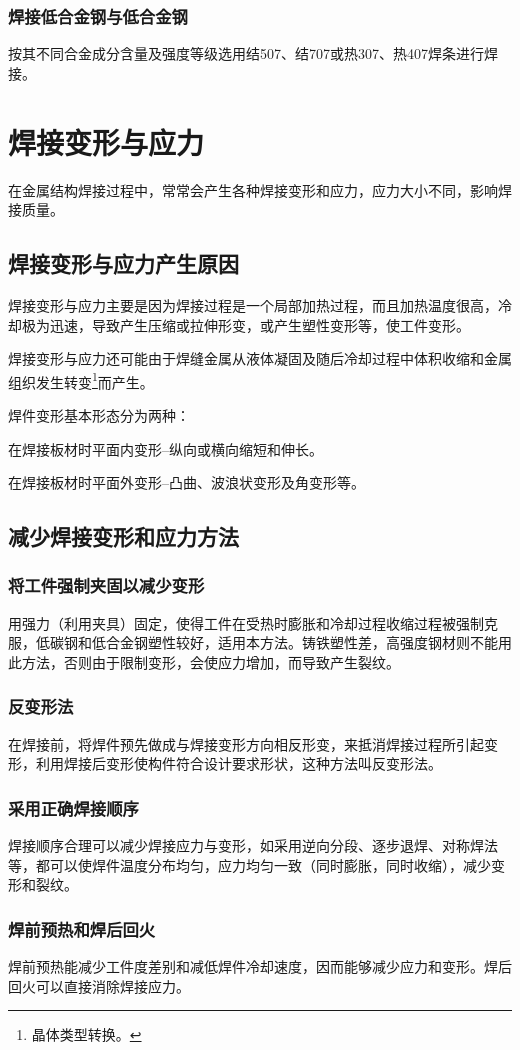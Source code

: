 \documentclass{ctexbook}
\begin{document}
\subsubsection{焊接低合金钢与低合金钢}
按其不同合金成分含量及强度等级选用结507、结707或热307、热407焊条进行焊接。
\section{焊接变形与应力}
在金属结构焊接过程中，常常会产生各种焊接变形和应力，应力大小不同，影响焊接质量。
\subsection{焊接变形与应力产生原因}
焊接变形与应力主要是因为焊接过程是一个局部加热过程，而且加热温度很高，冷却极为迅速，导致产生压缩或拉伸形变，或产生塑性变形等，使工件变形。

焊接变形与应力还可能由于焊缝金属从液体凝固及随后冷却过程中体积收缩和金属组织发生转变\footnote{晶体类型转换。}而产生。

焊件变形基本形态分为两种：

在焊接板材时平面内变形--纵向或横向缩短和伸长。

在焊接板材时平面外变形--凸曲、波浪状变形及角变形等。
\subsection{减少焊接变形和应力方法}
\subsubsection{将工件强制夹固以减少变形}
用强力（利用夹具）固定，使得工件在受热时膨胀和冷却过程收缩过程被强制克服，低碳钢和低合金钢塑性较好，适用本方法。铸铁塑性差，高强度钢材则不能用此方法，否则由于限制变形，会使应力增加，而导致产生裂纹。
\subsubsection{反变形法}
在焊接前，将焊件预先做成与焊接变形方向相反形变，来抵消焊接过程所引起变形，利用焊接后变形使构件符合设计要求形状，这种方法叫反变形法。
\subsubsection{采用正确焊接顺序}
焊接顺序合理可以减少焊接应力与变形，如采用逆向分段、逐步退焊、对称焊法等，都可以使焊件温度分布均匀，应力均匀一致（同时膨胀，同时收缩），减少变形和裂纹。
\subsubsection{焊前预热和焊后回火}
焊前预热能减少工件度差别和减低焊件冷却速度，因而能够减少应力和变形。焊后回火可以直接消除焊接应力。
\end{document}
